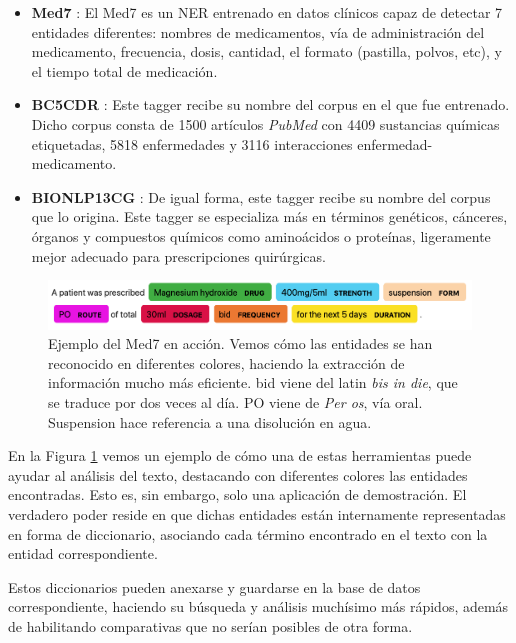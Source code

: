 \begin{itemize}
	\item \textbf{Med7} \cite{med7}: El Med7 es un NER entrenado en datos clínicos capaz de detectar 7 entidades diferentes: nombres de medicamentos, vía de administración del medicamento, frecuencia, dosis, cantidad, el formato (pastilla, polvos, etc), y el tiempo total de medicación. 
	\item \textbf{BC5CDR} \cite{bc5cdr}: Este tagger recibe su nombre del corpus en el que fue entrenado. Dicho corpus consta de 1500 artículos \textit{PubMed} con 4409 sustancias químicas etiquetadas, 5818 enfermedades y 3116 interacciones enfermedad-medicamento.
	\item \textbf{BIONLP13CG} \cite{BIONLP13CG}: De igual forma, este tagger recibe su nombre del corpus que lo origina. Este tagger se especializa más en términos genéticos, cánceres, órganos y compuestos químicos como aminoácidos o proteínas, ligeramente mejor adecuado para prescripciones quirúrgicas.
\end{itemize}

\begin{figure}[h]
	\centering
	\includegraphics[width=.9\textwidth]{media/med7_example.png}
	\caption{Ejemplo del Med7 en acción. Vemos cómo las entidades se han reconocido en diferentes colores, haciendo la extracción de información mucho más eficiente. bid viene del latin \textit{bis in die}, que se traduce por dos veces al día. PO viene de \textit{Per os}, vía oral. Suspension hace referencia a una disolución en agua.}
	\label{fig:med7}
\end{figure}

En la Figura \ref{fig:med7} vemos un ejemplo de cómo una de estas herramientas puede ayudar al análisis del texto, destacando con diferentes colores las entidades encontradas. Esto es, sin embargo, solo una aplicación de demostración. El verdadero poder reside en que dichas entidades están internamente representadas en forma de diccionario, asociando cada término encontrado en el texto con la entidad correspondiente. 

Estos diccionarios pueden anexarse y guardarse en la base de datos correspondiente, haciendo su búsqueda y análisis muchísimo más rápidos, además de habilitando comparativas que no serían posibles de otra forma.



